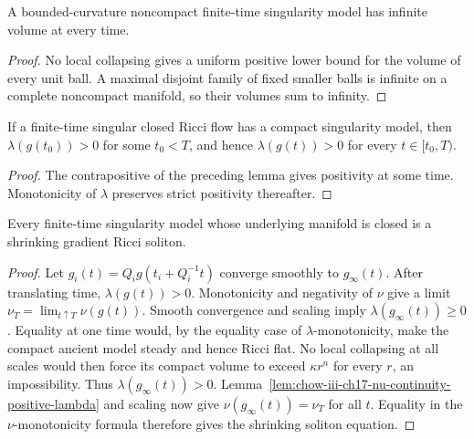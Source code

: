 \begin{remark}
\label{rem:chow-iii-ch17-noncompact-model-infinite-volume}

A bounded-curvature noncompact finite-time singularity model has infinite
volume at every time.
\end{remark}
\begin{proof}
\sketch No local collapsing gives a uniform positive lower bound for the volume of
every unit ball.  A maximal disjoint family of fixed smaller balls is
infinite on a complete noncompact manifold, so their volumes sum to infinity.
\end{proof}

\begin{corollary}
\label{cor:chow-iii-ch17-compact-model-positive-lambda}


If a finite-time singular closed Ricci flow has a compact singularity model,
then $\lambda(g(t_0))>0$ for some $t_0<T$, and hence
$\lambda(g(t))>0$ for every $t\in[t_0,T)$.
\end{corollary}
\begin{proof}
\sketch The contrapositive of the preceding lemma gives positivity at some time.
Monotonicity of $\lambda$ preserves strict positivity thereafter.
\end{proof}

\begin{theorem}
\label{thm:chow-iii-ch17-compact-model-shrinker}


Every finite-time singularity model whose underlying manifold is closed is a
shrinking gradient Ricci soliton.
\end{theorem}
\begin{proof}
\sketch Let $g_i(t)=Q_i g(t_i+Q_i^{-1}t)$ converge smoothly to $g_\infty(t)$.
After translating time, $\lambda(g(t))>0$.  Monotonicity and negativity of
$\nu$ give a limit $\nu_T=\lim_{t\uparrow T}\nu(g(t))$.
Smooth convergence and scaling imply $\lambda(g_\infty(t))\ge0$.  Equality
at one time would, by the equality case of $\lambda$-monotonicity, make the
compact ancient model steady and hence Ricci flat.  No local collapsing at
all scales would then force its compact volume to exceed $\kappa r^n$ for
every $r$, an impossibility.  Thus $\lambda(g_\infty(t))>0$.
Lemma~\ref{lem:chow-iii-ch17-nu-continuity-positive-lambda} and scaling now
give $\nu(g_\infty(t))=\nu_T$ for all $t$.  Equality in the
$\nu$-monotonicity formula therefore gives the shrinking soliton equation.
\end{proof}

